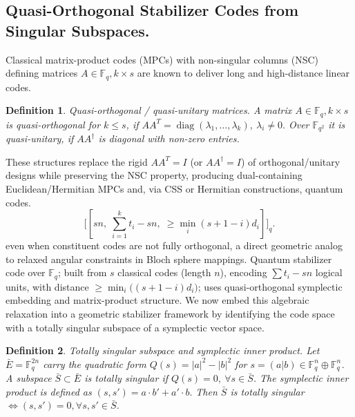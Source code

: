 \documentclass{iopjournal}
\theoremstyle{thmstyleone}%
\theoremstyle{thmstyletwo}%
\theoremstyle{thmstylethree}%
\newtheorem{definition}{Definition}%
\begin{document}
\subsection{Quasi-Orthogonal Stabilizer Codes from Singular Subspaces.}

Classical matrix-product codes (MPCs) with non-singular columns (NSC) defining matrices $A\in\mathbb{F}_q,{k\times s}$ are known to deliver long and high-distance linear codes.  
  
\begin{definition} Quasi-orthogonal / quasi-unitary matrices.
A matrix $A\in\mathbb{F}_q,{k\times s}$ is quasi-orthogonal for $k\leq s$, if \(A A^{\!T}= \operatorname{diag}(\lambda_1,\dots,\lambda_k),~\lambda_i\neq 0. \)
Over $\mathbb{F}_{q^2}$ it is quasi-unitary, if $A A^{\!\dagger}$ is diagonal with non-zero entries.
\end{definition}
These structures replace the rigid $A A^{T}=I$ (or $A A^{\dagger}=I$) of orthogonal/unitary designs while preserving the NSC property, producing  dual-containing Euclidean/Hermitian MPCs and, via CSS or Hermitian constructions, quantum codes.
\begin{equation}
\bigl[[sn,\;\sum_{i=1}^{k}t_i-sn,\;\ge\min_{i}(s+1-i)d_i]\bigr]_q.
\end{equation}
even when constituent codes are not fully orthogonal, a direct geometric analog to relaxed angular constraints in Bloch sphere mappings. Quantum stabilizer code over \( \mathbb{F}_q \); built from \( s \) classical codes (length \( n \)), encoding \( \sum t_i - sn \) logical units, with distance \( \ge \min_i\big((s{+}1{-}i)d_i\big) \); uses quasi-orthogonal symplectic embedding and matrix-product structure. We now embed this algebraic relaxation into a geometric stabilizer framework by identifying the code space with a totally singular subspace of a symplectic vector space.


\begin{definition} Totally singular subspace and symplectic inner product.
Let $\bar{E}=\mathbb{F}_q^{2n}$ carry the quadratic form $Q(s)=\lvert a\rvert^2-\lvert b\rvert^2$ for $s=(a|b)\in\mathbb{F}_q^n\oplus\mathbb{F}_q^n$.  
A subspace $\bar{S}\subset\bar{E}$ is totally singular if
\(Q(s)=0,~\forall s\in\bar{S}\).
The symplectic inner product is defined as
\((s,s')=a\cdot b'+a'\cdot b.\)
Then $\bar{S}$ is totally singular $\iff (s,s')=0, \forall s,s'\in\bar{S}$.
\end{definition}
\end{document}
